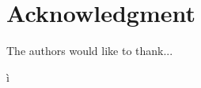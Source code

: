 \documentclass[conference]{IEEEtran}
\begin{document}

\section*{Acknowledgment}


The authors would like to thank...


\ifCLASSOPTIONcaptionsoff
  \newpage
\fi



 ì%

\end{document}
